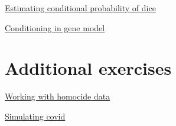 \begin{exercise}
\href{https://colab.research.google.com/drive/1Gs-gSsUP1hHVwhrbwvWzLVm1ulcLJKRI#scrollTo=HT5mXESCXWYx}{Estimating conditional probability of dice}
\end{exercise}

\begin{exercise}
\href{https://colab.research.google.com/drive/1Gs-gSsUP1hHVwhrbwvWzLVm1ulcLJKRI#scrollTo=HT5mXESCXWYx}{Conditioning in gene model}
\end{exercise}

\section{Additional exercises}

\begin{exercise}
\href{https://colab.research.google.com/drive/1Gs-gSsUP1hHVwhrbwvWzLVm1ulcLJKRI#scrollTo=vogWBcGHaZDM&line=3&uniqifier=1}{Working with homocide data}
\end{exercise}

\begin{exercise}
\href{https://colab.research.google.com/drive/1Gs-gSsUP1hHVwhrbwvWzLVm1ulcLJKRI#scrollTo=TnLORrmyBn6q&line=22&uniqifier=1}{Simulating covid}
\end{exercise}


















